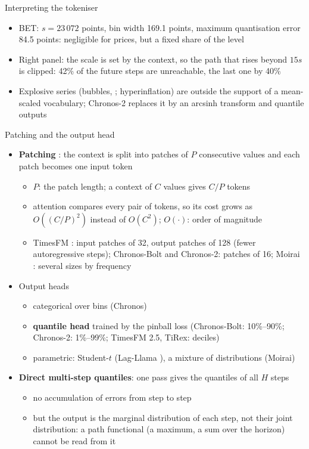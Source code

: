 \begin{frame}{Interpreting the tokeniser}
\itemsize{\small}
\begin{itemize}
    \item BET: $s = 23\,072$ points, bin width 169.1 points, maximum quantisation error 84.5 points: negligible for prices, but a fixed share of the level
    \item Right panel: the scale is set by the context, so the path that rises beyond $15s$ is clipped: 42\% of the future steps are unreachable, the last one by 40\%
    \item Explosive series (bubbles, ; hyperinflation) are outside the support of a mean-scaled vocabulary; Chronos-2 replaces it by an arcsinh transform and quantile outputs
\end{itemize}
\end{frame}

\begin{frame}{Patching and the output head}
\itemsize{\small}
\begin{itemize}
    \item \textbf{Patching} : the context is split into patches of $P$ consecutive values and each patch becomes one input token
    \begin{itemize}
        \item $P$: the patch length; a context of $C$ values gives $C/P$ tokens
        \item attention compares every pair of tokens, so its cost grows as $O((C/P)^2)$ instead of $O(C^2)$; $O(\cdot)$: order of magnitude
        \item TimesFM : input patches of 32, output patches of 128 (fewer autoregressive steps); Chronos-Bolt and Chronos-2: patches of 16; Moirai : several sizes by frequency
    \end{itemize}
    \item Output heads
    \begin{itemize}
        \item categorical over bins (Chronos)
        \item \textbf{quantile head} trained by the pinball loss (Chronos-Bolt: 10\%--90\%; Chronos-2: 1\%--99\%; TimesFM 2.5, TiRex: deciles)
        \item parametric: Student-$t$ (Lag-Llama ), a mixture of distributions (Moirai)
    \end{itemize}
    \item \textbf{Direct multi-step quantiles}: one pass gives the quantiles of all $H$ steps
    \begin{itemize}
        \item no accumulation of errors from step to step
        \item but the output is the marginal distribution of each step, not their joint distribution: a path functional (a maximum, a sum over the horizon) cannot be read from it
    \end{itemize}
\end{itemize}
\end{frame}

